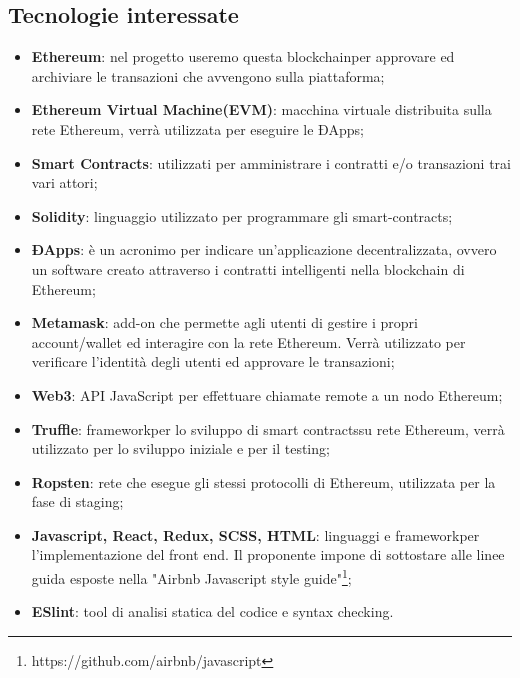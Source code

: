 \subsection{Tecnologie interessate}
\begin{itemize}
  
	\item \textbf{Ethereum\glo}: nel progetto useremo questa blockchain\glosp per approvare ed archiviare le transazioni che avvengono sulla piattaforma;
	\item \textbf{Ethereum Virtual Machine\glosp (EVM)}: macchina virtuale distribuita sulla rete Ethereum\glo, verrà utilizzata per eseguire le ÐApps\glo; 
	\item \textbf{Smart Contracts\glo}: utilizzati per amministrare i contratti e/o transazioni trai vari attori;
	\item \textbf{Solidity}: linguaggio utilizzato per programmare gli smart-contracts\glo;
	\item \textbf{ÐApps\glo}: è un acronimo per indicare un'applicazione decentralizzata, ovvero un software creato attraverso i contratti intelligenti nella blockchain di Ethereum\glo;
	\item \textbf{Metamask\glo}: add-on che permette agli utenti di gestire i propri account/wallet ed interagire con la rete Ethereum\glo. Verrà utilizzato per verificare l'identità degli utenti ed approvare le transazioni; 
	\item \textbf{Web3}: API JavaScript per effettuare chiamate remote a un nodo Ethereum\glo;
	\item \textbf{Truffle}: framework\glosp per lo sviluppo di smart contracts\glosp su rete Ethereum\glo, verrà utilizzato per lo sviluppo iniziale e per il testing;
	\item \textbf {Ropsten}: rete che esegue gli stessi protocolli di Ethereum\glo, utilizzata per la fase di staging\glo;
	\item \textbf{Javascript, React\glo, Redux\glo, SCSS\glo, HTML}: linguaggi e framework\glosp per l'implementazione del front end. Il proponente impone di sottostare alle linee guida esposte nella "Airbnb Javascript style guide"\footnote{https://github.com/airbnb/javascript};
	\item \textbf{ESlint\glo}: tool di analisi statica del codice e syntax checking.

\end{itemize}

